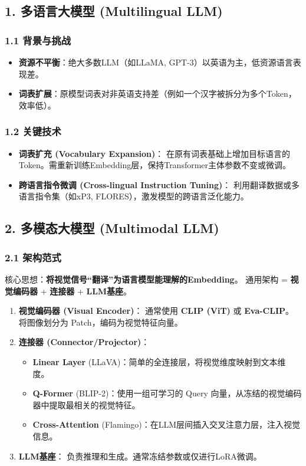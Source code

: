 \documentclass[a4paper, 11pt]{ctexart}
\begin{document}
\subsection{1. 多语言大模型 (Multilingual LLM)}

\subsubsection{1.1 背景与挑战}
\begin{itemize}
    \item \textbf{资源不平衡}：绝大多数LLM（如LLaMA, GPT-3）以英语为主，低资源语言表现差。
    \item \textbf{词表扩展}：原模型词表对非英语支持差（例如一个汉字被拆分为多个Token，效率低）。
\end{itemize}

\subsubsection{1.2 关键技术}
\begin{itemize}
    \item \textbf{词表扩充 (Vocabulary Expansion)}：
    在原有词表基础上增加目标语言的Token。需重新训练Embedding层，保持Transformer主体参数不变或微调。
    \item \textbf{跨语言指令微调 (Cross-lingual Instruction Tuning)}：
    利用翻译数据或多语言指令集（如xP3, FLORES），激发模型的跨语言泛化能力。
\end{itemize}

\subsection{2. 多模态大模型 (Multimodal LLM)}

\subsubsection{2.1 架构范式}
核心思想：\textbf{将视觉信号“翻译”为语言模型能理解的Embedding}。
通用架构 = \textbf{视觉编码器} + \textbf{连接器} + \textbf{LLM基座}。

\begin{enumerate}
    \item \textbf{视觉编码器 (Visual Encoder)}：
    通常使用 \textbf{CLIP (ViT)} 或 \textbf{Eva-CLIP}。
    将图像划分为 Patch，编码为视觉特征向量。
    \item \textbf{连接器 (Connector/Projector)}：
    \begin{itemize}
        \item \textbf{Linear Layer} (LLaVA)：简单的全连接层，将视觉维度映射到文本维度。
        \item \textbf{Q-Former} (BLIP-2)：使用一组可学习的 Query 向量，从冻结的视觉编码器中提取最相关的视觉特征。
        \item \textbf{Cross-Attention} (Flamingo)：在LLM层间插入交叉注意力层，注入视觉信息。
    \end{itemize}
    \item \textbf{LLM基座}：
    负责推理和生成。通常冻结参数或仅进行LoRA微调。
\end{enumerate}
\end{document}
